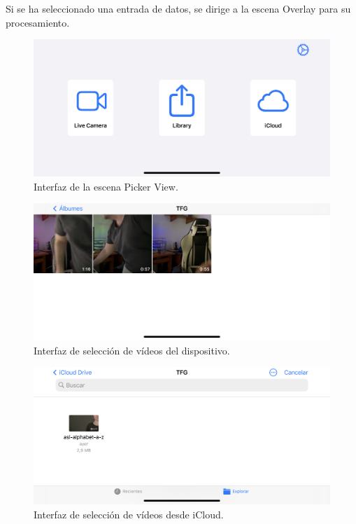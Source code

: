 \documentclass[../main.tex]{subfiles}
\begin{document}
Si se ha seleccionado una entrada de datos, se dirige a la escena Overlay para su procesamiento.

\begin{figure}[h]
\centering 
\includegraphics[width=1\textwidth]{images/interpreter/picker.PNG}
\caption{Interfaz de la escena Picker View.}
\label{figure20}
\end{figure}

\begin{figure}[h]
\centering 
\includegraphics[width=1\textwidth]{images/interpreter/library.PNG}
\caption{Interfaz de selección de vídeos del dispositivo.}
\label{figure21}
\end{figure}

\begin{figure}[h]
\centering 
\includegraphics[width=1\textwidth]{images/interpreter/icloud.PNG}
\caption{Interfaz de selección de vídeos desde iCloud.}
\label{figure22}
\end{figure}
\end{document}
